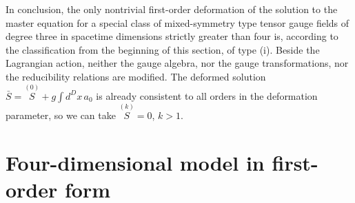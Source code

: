 \documentclass[a4paper,12pt]{article}
\begin{document}
In conclusion, the only nontrivial first-order deformation of the solution
to the master equation for a special class of mixed-symmetry type tensor
gauge fields of degree three in spacetime dimensions strictly greater than
four is, according to the classification from the beginning of this section,
of type (i). Beside the Lagrangian action, neither the gauge algebra, nor
the gauge transformations, nor the reducibility relations are modified. The
deformed solution $\bar{S}=\stackrel{(0)}{S}+g\int d^{D}x\,a_{0}$ is already
consistent to all orders in the deformation parameter, so we can take $%
\stackrel{(k)}{S}=0$, $k>1$.

\section{Four-dimensional model in first-order form}
\end{document}
